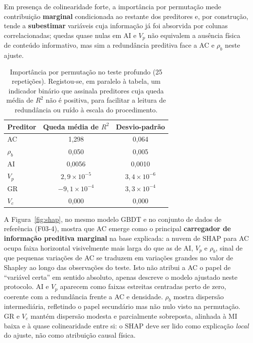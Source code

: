 \documentclass[12pt,a4paper]{article}
\newcommand{\dadosref}{conjunto de dados de referência (F03-4)}
\begin{document}
Em presença de colinearidade forte, a importância por permutação mede
contribuição \textbf{marginal} condicionada ao restante dos preditores e, por
construção, tende a \textbf{subestimar} variáveis cuja informação já foi
absorvida por colunas correlacionadas; quedas quase nulas em AI e \(V_p\) não
equivalem a ausência física de conteúdo informativo, mas sim a redundância
preditiva face a AC e \(\rho_b\) neste ajuste.

\begin{table}[h]
\centering
\small
\begin{tabular}{lcc}
\toprule
Preditor & Queda média de \(R^2\) & Desvio-padrão \\
\midrule
AC & 1{,}298 & 0{,}064 \\
\(\rho_b\) & 0{,}050 & 0{,}005 \\
AI & 0{,}0056 & 0{,}0010 \\
\(V_p\) & \(2{,}9\times 10^{-5}\) & \(3{,}4\times 10^{-6}\) \\
GR & \(-9{,}1\times 10^{-4}\) & \(3{,}3\times 10^{-4}\) \\
\(V_c\) & 0{,}000 & 0{,}000 \\
\bottomrule
\end{tabular}
\caption{Importância por permutação no teste profundo (25 repetições). Registou-se,
em paralelo à tabela, um indicador binário que assinala preditores cuja queda média de
\(R^2\) não é positiva, para facilitar a leitura de redundância ou ruído à escala do procedimento.}
\label{tab:perm_r2}
\end{table}

A Figura~\ref{fig:shap}, no mesmo modelo GBDT e no \dadosref, mostra que AC
emerge como o principal \textbf{carregador de informação preditiva marginal} na
base explicada: a nuvem de SHAP para AC ocupa faixa horizontal visivelmente mais larga
do que as de AI, \(V_p\) e \(\rho_b\), sinal de que pequenas variações de AC se
traduzem em variações grandes no valor de Shapley ao longo das observações
do teste. Isto não atribui a AC o papel de ``variável certa'' em sentido absoluto,
apenas descreve o modelo ajustado neste protocolo. AI e
\(V_p\) aparecem como faixas estreitas centradas perto de zero, coerente com a
redundância frente a AC e densidade. \(\rho_b\) mostra dispersão intermediária,
refletindo o papel secundário mas não nulo visto na permutação. GR e \(V_c\)
mantém dispersão modesta e parcialmente sobreposta, alinhada à MI baixa e à
quase colinearidade entre si: o SHAP deve ser lido como explicação \textit{local}
do ajuste, não como atribuição causal física.
\end{document}
